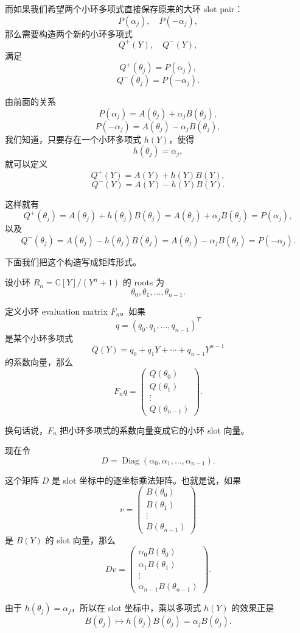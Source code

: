 \documentclass[UTF8,11pt]{ctexart}
\theoremstyle{definition}
\begin{document}
而如果我们希望两个小环多项式直接保存原来的大环 slot pair：
\[
P(\alpha_j),\quad P(-\alpha_j),
\]
那么需要构造两个新的小环多项式
\[
Q^+(Y),\quad Q^-(Y),
\]
满足
\[
Q^+(\theta_j)=P(\alpha_j),
\]
\[
Q^-(\theta_j)=P(-\alpha_j).
\]

由前面的关系
\[
P(\alpha_j)=A(\theta_j)+\alpha_jB(\theta_j),
\]
\[
P(-\alpha_j)=A(\theta_j)-\alpha_jB(\theta_j),
\]
我们知道，只要存在一个小环多项式 \(h(Y)\)，使得
\[
h(\theta_j)=\alpha_j,
\]
就可以定义
\[
Q^+(Y)=A(Y)+h(Y)B(Y),
\]
\[
Q^-(Y)=A(Y)-h(Y)B(Y).
\]

这样就有
\[
Q^+(\theta_j)
=
A(\theta_j)+h(\theta_j)B(\theta_j)
=
A(\theta_j)+\alpha_jB(\theta_j)
=
P(\alpha_j),
\]
以及
\[
Q^-(\theta_j)
=
A(\theta_j)-h(\theta_j)B(\theta_j)
=
A(\theta_j)-\alpha_jB(\theta_j)
=
P(-\alpha_j).
\]

下面我们把这个构造写成矩阵形式。

设小环 \(R_n=\mathbb{C}[Y]/(Y^n+1)\) 的 roots 为
\[
\theta_0,\theta_1,\ldots,\theta_{n-1}.
\]

定义小环 evaluation matrix \(F_n\)。如果
\[
q=(q_0,q_1,\ldots,q_{n-1})^T
\]
是某个小环多项式
\[
Q(Y)=q_0+q_1Y+\cdots+q_{n-1}Y^{n-1}
\]
的系数向量，那么
\[
F_n q
=
\begin{pmatrix}
Q(\theta_0)\\
Q(\theta_1)\\
\vdots\\
Q(\theta_{n-1})
\end{pmatrix}.
\]

换句话说，\(F_n\) 把小环多项式的系数向量变成它的小环 slot 向量。

现在令
\[
D=\operatorname{Diag}(\alpha_0,\alpha_1,\ldots,\alpha_{n-1}).
\]

这个矩阵 \(D\) 是 slot 坐标中的逐坐标乘法矩阵。也就是说，如果
\[
v=
\begin{pmatrix}
B(\theta_0)\\
B(\theta_1)\\
\vdots\\
B(\theta_{n-1})
\end{pmatrix}
\]
是 \(B(Y)\) 的 slot 向量，那么
\[
Dv
=
\begin{pmatrix}
\alpha_0B(\theta_0)\\
\alpha_1B(\theta_1)\\
\vdots\\
\alpha_{n-1}B(\theta_{n-1})
\end{pmatrix}.
\]

由于 \(h(\theta_j)=\alpha_j\)，所以在 slot 坐标中，乘以多项式 \(h(Y)\) 的效果正是
\[
B(\theta_j)\longmapsto h(\theta_j)B(\theta_j)=\alpha_jB(\theta_j).
\]
\end{document}
